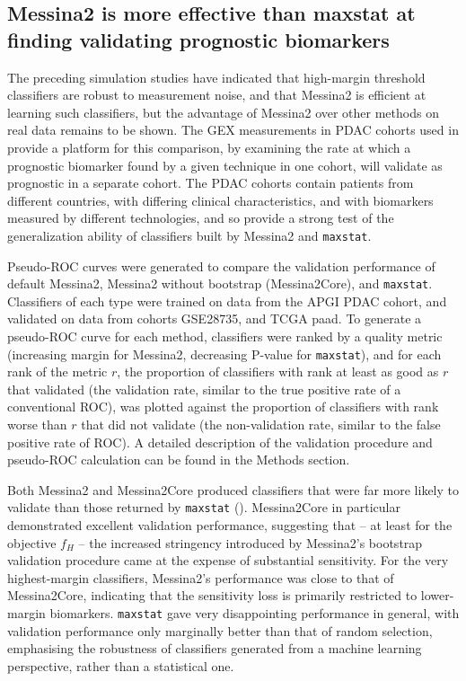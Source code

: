 \documentclass[dissertation.tex]{subfiles}
\begin{document}
\subsection{Messina2 is more effective than maxstat at finding validating prognostic biomarkers}
The preceding simulation studies have indicated that high-margin threshold classifiers are robust to measurement noise, and that Messina2 is efficient at learning such classifiers, but the advantage of Messina2 over other methods on real data remains to be shown.  The \gls{GEX} measurements in \gls{PDAC} cohorts used in  provide a platform for this comparison, by examining the rate at which a prognostic biomarker found by a given technique in one cohort, will validate as prognostic in a separate cohort.  The \gls{PDAC} cohorts contain patients from different countries, with differing clinical characteristics, and with biomarkers measured by different technologies, and so provide a strong test of the generalization ability of classifiers built by Messina2 and \texttt{maxstat}.

Pseudo-\gls{ROC} curves were generated to compare the validation performance of default Messina2, Messina2 without bootstrap (Messina2Core), and \texttt{maxstat}.  Classifiers of each type were trained on data from the \gls{APGI} \gls{PDAC} cohort, and validated on data from cohorts GSE28735, and \gls{TCGA} paad.  To generate a pseudo-\gls{ROC} curve for each method, classifiers were ranked by a quality metric (increasing margin for Messina2, decreasing P-value for \texttt{maxstat}), and for each rank of the metric $r$, the proportion of classifiers with rank at least as good as $r$ that validated (the validation rate, similar to the true positive rate of a conventional \gls{ROC}), was plotted against the proportion of classifiers with rank worse than $r$ that did not validate (the non-validation rate, similar to the false positive rate of \gls{ROC}).  A detailed description of the validation procedure and pseudo-ROC calculation can be found in the Methods section.

Both Messina2 and Messina2Core produced classifiers that were far more likely to validate than those returned by \texttt{maxstat} ().  Messina2Core in particular demonstrated excellent validation performance, suggesting that -- at least for the objective $f_H$ -- the increased stringency introduced by Messina2's bootstrap validation procedure came at the expense of substantial sensitivity.  For the very highest-margin classifiers, Messina2's performance was close to that of Messina2Core, indicating that the sensitivity loss is primarily restricted to lower-margin biomarkers.  \texttt{maxstat} gave very disappointing performance in general, with validation performance only marginally better than that of random selection, emphasising the robustness of classifiers generated from a machine learning perspective, rather than a statistical one.
\end{document}
